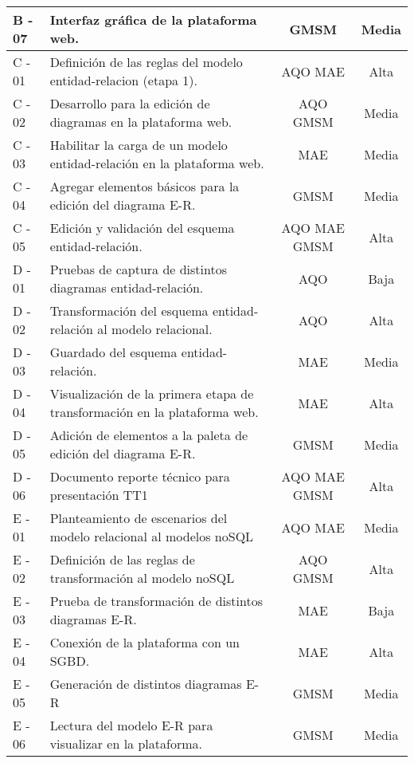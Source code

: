 \begin{longtable}{ p{1.3cm} | p{7.6cm} | c | c }
	\centering B - 07 & Interfaz gráfica de la plataforma web. & GMSM & Media \\[.5cm]
	\hline
	\centering C - 01 & Definición de las reglas del modelo	entidad-relacion (etapa 1). & AQO MAE & Alta \\[.5cm]
	\hline
	\centering C - 02 & Desarrollo para la edición de diagramas en la plataforma web. & AQO GMSM& Media \\[.5cm]
	\hline
	\centering C - 03 & Habilitar la carga de un modelo entidad-relación en la plataforma web. & MAE & Media \\[.5cm]
	\hline
	\centering C - 04 & Agregar elementos básicos para la edición del diagrama E-R. & GMSM & Media \\[.5cm]
	\hline
	\centering C - 05 & Edición y validación del esquema entidad-relación. & AQO MAE GMSM & Alta \\[.5cm]
	\hline
	\centering D - 01 & Pruebas de captura de distintos diagramas entidad-relación. & AQO & Baja \\[.5cm]
	\hline
	\centering D - 02 & Transformación del esquema entidad-relación al modelo relacional. & AQO & Alta \\[.5cm]
	\hline
	\centering D - 03 & Guardado del esquema entidad-relación. & MAE & Media \\[.5cm]
	\hline
	\centering D - 04 & Visualización de la primera etapa de transformación en la plataforma web. & MAE & Alta \\[.5cm]
	\hline
	\centering D - 05 & Adición de elementos a la paleta de edición del diagrama E-R. & GMSM & Media \\[.5cm]
	\hline
	\centering D - 06 & Documento reporte técnico para presentación	TT1 & AQO MAE GMSM & Alta \\[.5cm]
	\hline
	\centering E - 01 & Planteamiento de escenarios del modelo relacional al modelos noSQL & AQO MAE & Media \\[.5cm]
	\hline
	\centering E - 02 & Definición de las reglas de transformación al modelo noSQL & AQO GMSM& Alta \\[.5cm]
	\hline
	\centering E - 03 & Prueba de transformación de distintos diagramas E-R. & MAE & Baja \\[.5cm]
	\hline
	\centering E - 04 & Conexión de la plataforma con un SGBD. & MAE & Alta \\[.5cm]
	\hline
	\centering E - 05 & Generación de distintos	diagramas E-R & GMSM & Media \\[.5cm]
	\hline
	\centering E - 06 & Lectura del modelo E-R para	visualizar en la plataforma. & GMSM & Media \\[.5cm]

\end{longtable}
